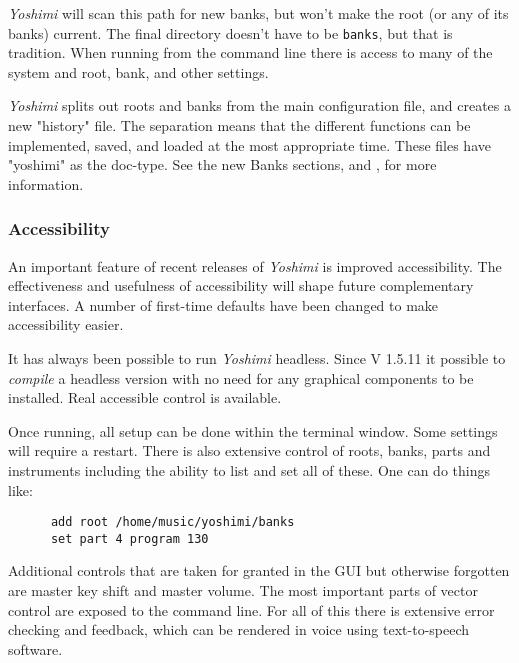 \documentclass[
 11pt,
 twoside,
 a4paper,
 final                                 %
]{article}
\begin{document}
   \textsl{Yoshimi} will scan this path for new banks, but
   won't make the root (or any of its banks) current. The final directory
   doesn't have to be \texttt{banks}, but that is tradition.
   When running from the command line there is access to many
   of the system and root, bank, and other settings.

   \textsl{Yoshimi} splits out roots and banks from the main configuration
   file, and creates a new "history" file. The separation means that the
   different functions can be implemented, saved, and loaded at the most
   appropriate time. These files have "yoshimi" as the doc-type.
   See the new Banks sections,
   and
   ,
   for more information.

\subsubsection{Accessibility}
\label{subsubsec:new_features_accessibility}

   An important feature of recent releases of \textsl{Yoshimi} is improved
   accessibility. The effectiveness and usefulness of accessibility will
   shape future complementary interfaces. A number of first-time defaults
   have been changed to make accessibility easier.

   It has always been possible to run \textsl{Yoshimi} headless. Since V 1.5.11
   it possible to \textsl{compile} a headless version with no need for
   any graphical components to be installed.
   Real accessible control is available.


   Once running, all setup can be done within the terminal window.
   Some settings will require a restart.
   There is also extensive control of
   roots, banks, parts and instruments including the ability to list and set
   all of these. One can do things like:

   \begin{verbatim}
      add root /home/music/yoshimi/banks
      set part 4 program 130
   \end{verbatim}

   Additional controls that are taken for granted in the GUI but
   otherwise forgotten are master key shift and master volume.  The
   most important parts of vector control are exposed to the command line.
   For all of this there is extensive error checking and feedback, which can be
   rendered in voice using text-to-speech software.
\end{document}
